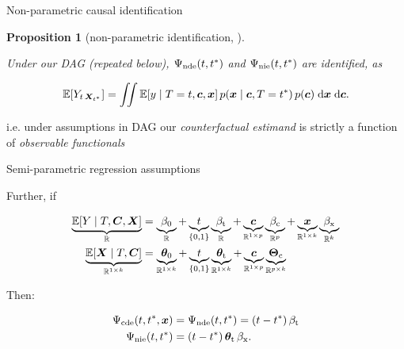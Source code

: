 \documentclass{beamer}
\newtheorem{proposition}{Proposition}
\theoremstyle{remark}
\renewcommand{\c}{\bm c}
\newcommand{\x}{\bm x}
\newcommand{\C}{\bm C}
\newcommand{\X}{\bm X}
\newcommand{\thetazero}{\bm \theta_0}
\newcommand{\thetat}{\bm \theta_\text{t}}
\newcommand{\Thetac}{\bm \Theta_\text{c}}
\newcommand{\betazero}{\beta_0}
\newcommand{\betat}{\beta_\text{t}}
\newcommand{\betac}{\beta_\text{c}}
\newcommand{\betax}{\beta_\text{x}}
\newcommand{\cde}{\Psi_\text{cde} \paren*{t, t^*, \x}}
\newcommand{\nde}{\Psi_\text{nde} \paren*{t, t^*}}
\newcommand{\nie}{\Psi_\text{nie} \paren*{t, t^*}}
\newcommand \cond {\mid}
\DeclarePairedDelimiter{\paren}{(}{)}
\DeclarePairedDelimiter{\brac}{[}{]}
\newcommand{\dx}[1][]{%
   \ifthenelse{ \equal{#1}{} }
      {\ensuremath{\;\mathrm{d}x}}
      {\ensuremath{\;\mathrm{d}#1}}
}
\newcommand{\E}[2][]{%
   \ifthenelse{ \equal{#1}{} }
      {\ensuremath{\mathbb{E} \brac*{#2}}}
      {\ensuremath{\mathbb{E} \brac*{#2 \mid #1}}}
}
\begin{document}
\begin{frame}{Non-parametric causal identification}

    \begin{proposition}[non-parametric identification, \cite{imai_identification_2010}]
        \label{prop:non-parametric-identification}

        Under our DAG (repeated below), $\nde$ and $\nie$ are identified, as

        \begin{align*}
            \label{eq:non-param-nested}
            \E{Y_{t \, \X_{t^*}}}
            = \iint \E[T = t, \c, \x]{y} \, p(\x \cond \c, T = t^*) \, p(\c) \dx[\x] \dx[\c].
        \end{align*}

    \end{proposition}

    i.e. under assumptions in DAG our \emph{counterfactual estimand} is strictly a function of \emph{observable functionals}

\end{frame}

\begin{frame}{Semi-parametric regression assumptions}

    Further, if

    \begin{align*}
        \underbrace{\E[T, \C, \X]{Y}}_{\mathbb R}
         & = \underbrace{\betazero}_{\mathbb R}
        + \underbrace{t}_{\{0, 1\}} \underbrace{\betat}_{\mathbb R}
        + \underbrace{\c}_{\mathbb R^{1 \times p}} \underbrace{\betac}_{\mathbb R^p}
        + \underbrace{\x}_{\mathbb R^{1 \times k}} \underbrace{\betax}_{\mathbb R^k} \\
        \underbrace{\E[T, \C]{\X}}_{\mathbb R^{1 \times k}}
         & = \underbrace{\thetazero}_{\mathbb R^{1 \times k}}
        + \underbrace{t}_{\{0, 1\}} \underbrace{\thetat}_{\mathbb R^{1 \times k}}
        + \underbrace{\c}_{\mathbb R^{1 \times p}} \underbrace{\Thetac}_{\mathbb R^{p \times k}}
    \end{align*}

    Then:

    \begin{align*}
        \cde & = \nde = \paren*{t - t^*} \, \betat      \\
        \nie & = \paren*{t - t^*} \, \thetat \, \betax.
    \end{align*}

\end{frame}
\end{document}
